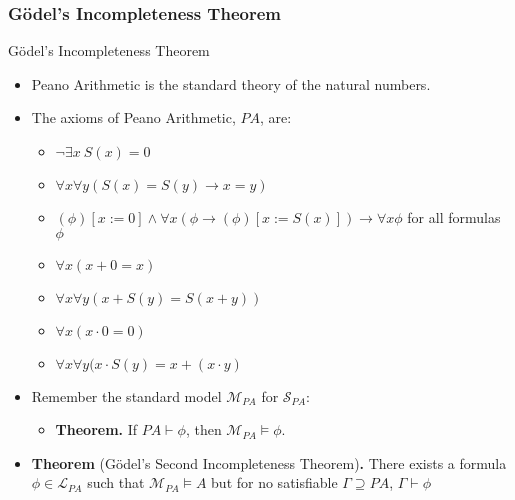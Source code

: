 \subsubsection{G\"odel's Incompleteness Theorem}
\begin{frame}{G\"odel's Incompleteness Theorem}

  \begin{itemize}
  \item Peano Arithmetic is the standard theory of the natural numbers.
  \item The axioms of Peano Arithmetic, $PA$, are:
    \begin{itemize}
    \item $\neg \exists x~S(x)=0$
    \item $\forall x\forall y(S(x)=S(y)\to x=y)$
    \item $(\phi)[x:=0]\land \forall x(\phi\to (\phi)[x:=S(x)])\to
      \forall x\phi$ for all formulas $\phi$
     \item $\forall x(x+0=x)$
     \item $\forall x\forall y(x+S(y)=S(x+y))$
     \item $\forall x(x\cdot 0=0)$
     \item $\forall x\forall y(x\cdot S(y)=x+(x\cdot y)$
    \end{itemize}

   \item Remember the standard model $\mathcal{M}_{PA}$ for
     $\mathcal{S}_{PA}$:

     \begin{itemize}
     \item \textbf{Theorem.} If $PA\vdash \phi$, then
       $\mathcal{M}_{PA}\vDash\phi$.

      
     \end{itemize}

      \item \textbf{Theorem} (G\"odel's Second Incompleteness
         Theorem)\textbf{.} There exists a formula
       $\phi\in\mathcal{L}_{PA}$ such that $\mathcal{M}_{PA}\vDash A$
       but for no satisfiable $\Gamma\supseteq PA$, $\Gamma\vdash \phi$

  \end{itemize}

\end{frame}


